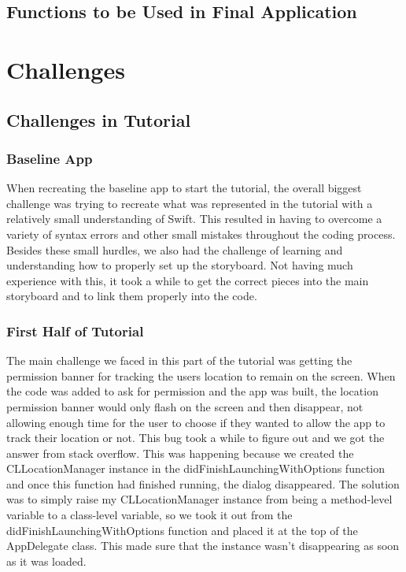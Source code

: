 \documentclass[conference]{IEEEtran}
\begin{document}
\subsection{Functions to be Used in Final Application}

\section{Challenges}

\subsection{Challenges in Tutorial}

\subsubsection{Baseline App}
When recreating the baseline app to start the tutorial, the overall biggest challenge
was trying to recreate what was represented in the tutorial with a relatively small
understanding of Swift. This resulted in having to overcome a variety of syntax errors
and other small mistakes throughout the coding process. Besides these small hurdles,
we also had the challenge of learning and understanding how to properly set up the 
storyboard. Not having much experience with this, it took a while to get the correct 
pieces into the main storyboard and to link them properly into the code.

\subsubsection{First Half of Tutorial}
The main challenge we faced in this part of the tutorial was getting the permission 
banner for tracking the users location to remain on the screen. When the code was 
added to ask for permission and the app was built, the location permission banner 
would only flash on the screen and then disappear, not allowing enough time for the 
user to choose if they wanted to allow the app to track their location or not. This bug 
took a while to figure out and we got the answer from stack overflow. This was happening 
because we created the CLLocationManager instance in the didFinishLaunchingWithOptions 
function and once this function had finished running, the dialog disappeared. The solution 
was to simply raise my CLLocationManager instance from being a method-level variable to a 
class-level variable, so we took it out from the didFinishLaunchingWithOptions function and 
placed it at the top of the AppDelegate class. This made sure that the instance wasn't 
disappearing as soon as it was loaded. 
\end{document}
